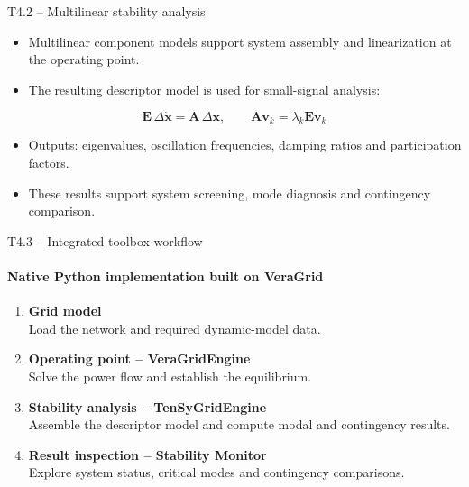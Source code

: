\documentclass[aspectratio=1609,9pt]{beamer}
\begin{document}
\begin{frame}[t]{T4.2 -- Multilinear stability analysis}
  \vspace{1ex}
  \begin{itemize}\setlength{\itemsep}{1.5ex}
    \item Multilinear component models support system assembly and linearization at the operating point.
    \item The resulting descriptor model is used for small-signal analysis:
  \end{itemize}
  \vspace{0.5ex}
  \[
    \mathbf{E}\,\Delta\dot{\mathbf{x}}=\mathbf{A}\,\Delta \mathbf{x},
    \qquad \mathbf{A} \mathbf{v}_k=\lambda_k \mathbf{E} \mathbf{v}_k
  \]
  \vspace{0.5ex}
  \begin{itemize}\setlength{\itemsep}{1.5ex}
    \item Outputs: eigenvalues, oscillation frequencies, damping ratios and participation factors.
    \item These results support system screening, mode diagnosis and contingency comparison.
  \end{itemize}
\end{frame}

\begin{frame}[t]{T4.3 -- Integrated toolbox workflow}
  \framesubtitle{Native Python implementation built on VeraGrid}
  \vspace{1ex}
  \begin{enumerate}\setlength{\itemsep}{1.5ex}
    \item \textbf{Grid model}\\
      Load the network and required dynamic-model data.
    \item \textbf{Operating point -- VeraGridEngine}\\
      Solve the power flow and establish the equilibrium.
    \item \textbf{Stability analysis -- TenSyGridEngine}\\
      Assemble the descriptor model and compute modal and contingency results.
    \item \textbf{Result inspection -- Stability Monitor}\\
      Explore system status, critical modes and contingency comparisons.
  \end{enumerate}
\end{frame}
\end{document}
